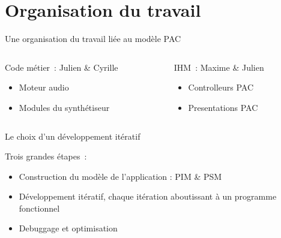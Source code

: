 \documentclass[frenchb]{beamer}
\begin{document}
\section{Organisation du travail}
\begin{frame}{Une organisation du travail liée au modèle PAC}
 \begin{columns}[t]
  \begin{column}{5cm}
  \begin{block}{Code métier~: Julien \& Cyrille}
             \begin{itemize}
                \item Moteur audio
                \item Modules du synthétiseur
            \end{itemize}    
  \end{block} 
  \end{column}
  
  \begin{column}{5cm}
  \begin{block}{IHM~: Maxime \& Julien}
            \begin{itemize}
                \item Controlleurs PAC
                \item Presentations PAC
            \end{itemize}
  \end{block}   
  \end{column}
 \end{columns}  
\end{frame}

\begin{frame}{Le choix d'un développement itératif}

\begin{block}{Trois grandes étapes~:}
\begin{itemize}
    \item Construction du modèle de l'application : PIM \& PSM
    \item Développement itératif, chaque itération aboutissant à un programme fonctionnel
    \item Debuggage et optimisation
\end{itemize}
\end{block}
\end{frame}
\end{document}
